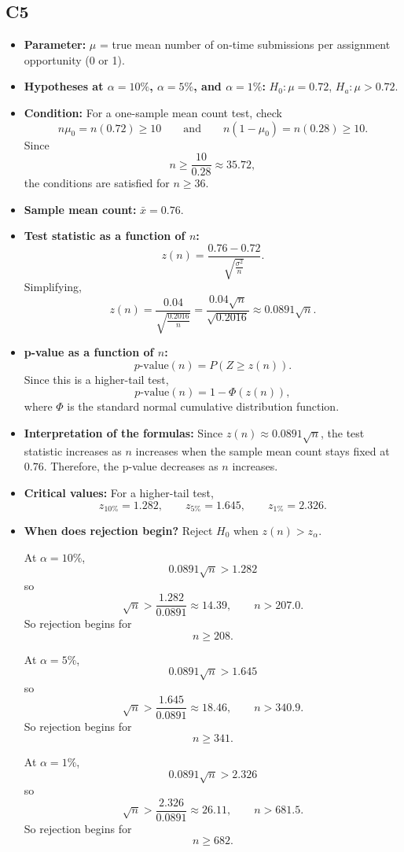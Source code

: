 \subsection*{C5}
\begin{itemize}
	\item \textbf{Parameter:} \(\mu\) = true mean number of on-time submissions per assignment opportunity (0 or 1).
	\item \textbf{Hypotheses at \(\alpha=10\%\), \(\alpha=5\%\), and \(\alpha=1\%\):} \(H_0\colon \mu=0.72\), \(H_a\colon \mu>0.72\).
	\item \textbf{Condition:} For a one-sample mean count test, check
	\[
	n\mu_0=n(0.72)\ge10
	\qquad\text{and}\qquad
	n(1-\mu_0)=n(0.28)\ge10.
	\]
	Since
	\[
	n\ge \frac{10}{0.28}\approx 35.72,
	\]
	the conditions are satisfied for \(n\ge36\).
	\item \textbf{Sample mean count:} \(\bar x=0.76\).
	\item \textbf{Test statistic as a function of \(n\):}
	\[
	z(n)=\frac{0.76-0.72}{\sqrt{\frac{\sigma^2}{n}}}.
	\]
	Simplifying,
	\[
	z(n)=\frac{0.04}{\sqrt{\frac{0.2016}{n}}}
	=\frac{0.04\sqrt{n}}{\sqrt{0.2016}}
	\approx 0.0891\sqrt{n}.
	\]
	\item \textbf{p-value as a function of \(n\):}
	\[
	p\text{-value}(n)=P(Z\ge z(n)).
	\]
	Since this is a higher-tail test,
	\[
	p\text{-value}(n)=1-\Phi(z(n)),
	\]
	where \(\Phi\) is the standard normal cumulative distribution function.
	\item \textbf{Interpretation of the formulas:} Since \(z(n)\approx 0.0891\sqrt{n}\), the test statistic increases as \(n\) increases when the sample mean count stays fixed at \(0.76\). Therefore, the p-value decreases as \(n\) increases.
	\item \textbf{Critical values:} For a higher-tail test,
	\[
	z_{10\%}=1.282,\qquad z_{5\%}=1.645,\qquad z_{1\%}=2.326.
	\]
	\item \textbf{When does rejection begin?} Reject \(H_0\) when \(z(n)>z_\alpha\).
	
	At \(\alpha=10\%\),
	\[
	0.0891\sqrt{n}>1.282
	\]
	so
	\[
	\sqrt{n}>\frac{1.282}{0.0891}\approx 14.39,
	\qquad
	n>207.0.
	\]
	So rejection begins for
	\[
	n\ge208.
	\]
	
	At \(\alpha=5\%\),
	\[
	0.0891\sqrt{n}>1.645
	\]
	so
	\[
	\sqrt{n}>\frac{1.645}{0.0891}\approx 18.46,
	\qquad
	n>340.9.
	\]
	So rejection begins for
	\[
	n\ge341.
	\]
	
	At \(\alpha=1\%\),
	\[
	0.0891\sqrt{n}>2.326
	\]
	so
	\[
	\sqrt{n}>\frac{2.326}{0.0891}\approx 26.11,
	\qquad
	n>681.5.
	\]
	So rejection begins for
	\[
	n\ge682.
	\]
	

\end{itemize}
